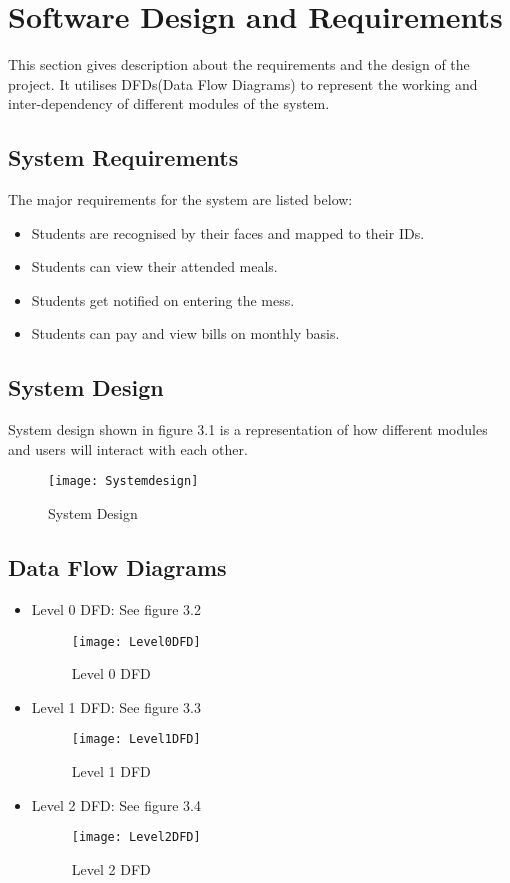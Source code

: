 \chapter{Software Design and Requirements}
This section gives description about the requirements and the design of the project. It utilises DFDs(Data Flow Diagrams) to represent the working and inter-dependency of different modules of the system.
\section{System Requirements}
The major requirements for the system are listed below:
	\begin{itemize}
		\item Students are recognised by their faces and mapped to their IDs.
		\item Students can view their attended meals.
		\item Students get notified on entering the mess.
		\item Students can pay and view bills on monthly basis.
	\end{itemize}
\section{System Design}
System design shown in figure 3.1 is a representation of how different modules and users will interact with each other.
	\begin{figure}[!h]
    		\centering
    		\texttt{[image: Systemdesign]}
    		\label{System Designo}
    		\caption{System Design}
	\end{figure}
\section{Data Flow Diagrams}
	\begin{itemize}
		\item Level 0 DFD: See figure 3.2
		\begin{figure}[!h]
    			\centering
    			\texttt{[image: Level0DFD]}
    			\caption{Level 0 DFD}
		\end{figure}
		\item Level 1 DFD: See figure 3.3
		\begin{figure}[!h]
    			\centering
    			\texttt{[image: Level1DFD]}
    			\caption{Level 1 DFD}
		\end{figure}
		\item Level 2 DFD: See figure 3.4
		\begin{figure}[!h]
    			\centering
    			\texttt{[image: Level2DFD]}
    			\caption{Level 2 DFD}
		\end{figure}
	\end{itemize}
